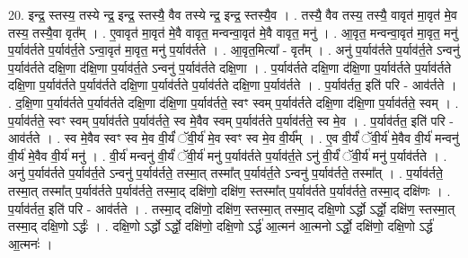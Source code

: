 \documentclass[17pt]{extarticle}
\begin{document}
20. इन्द्र॒ स्तस्य॒ तस्ये न्द्र॒ इन्द्र॒ स्तस्यै॒ वैव तस्ये न्द्र॒ इन्द्र॒ स्तस्यै॒व । . तस्यै॒ वैव तस्य॒ तस्यै॒ वावृत॑ मा॒वृत॑ मे॒व तस्य॒ तस्यै॒वा वृत᳚म् । . ए॒वावृत॑ मा॒वृत॑ मे॒वै वावृत॒ मन्वन्वा॒वृत॑ मे॒वै वावृत॒ मनु॑ । . आ॒वृत॒ मन्वन्वा॒वृत॑ मा॒वृत॒ मनु॑ प॒र्याव॑र्तते प॒र्याव॑र्त॒ते ऽन्वा॒वृत॑ मा॒वृत॒ मनु॑ प॒र्याव॑र्तते । . आ॒वृत॒मित्या᳚ - वृत᳚म् । . अनु॑ प॒र्याव॑र्तते प॒र्याव॑र्त॒ते ऽन्वनु॑ प॒र्याव॑र्तते दक्षि॒णा द॑क्षि॒णा प॒र्याव॑र्त॒ते ऽन्वनु॑ प॒र्याव॑र्तते दक्षि॒णा । . प॒र्याव॑र्तते दक्षि॒णा द॑क्षि॒णा प॒र्याव॑र्तते प॒र्याव॑र्तते दक्षि॒णा प॒र्याव॑र्तते प॒र्याव॑र्तते दक्षि॒णा प॒र्याव॑र्तते प॒र्याव॑र्तते दक्षि॒णा प॒र्याव॑र्तते । . प॒र्याव॑र्तत॒ इति॑ परि - आव॑र्तते । . द॒क्षि॒णा प॒र्याव॑र्तते प॒र्याव॑र्तते दक्षि॒णा द॑क्षि॒णा प॒र्याव॑र्तते॒ स्वꣳ स्वम् प॒र्याव॑र्तते दक्षि॒णा द॑क्षि॒णा प॒र्याव॑र्तते॒ स्वम् । . प॒र्याव॑र्तते॒ स्वꣳ स्वम् प॒र्याव॑र्तते प॒र्याव॑र्तते॒ स्व मे॒वैव स्वम् प॒र्याव॑र्तते प॒र्याव॑र्तते॒ स्व मे॒व । . प॒र्याव॑र्तत॒ इति॑ परि - आव॑र्तते । . स्व मे॒वैव स्वꣳ स्व मे॒व वी॒र्यं॑ ॅवी॒र्य॑ मे॒व स्वꣳ स्व मे॒व वी॒र्य᳚म् । . ए॒व वी॒र्यं॑ ॅवी॒र्य॑ मे॒वैव वी॒र्य॑ मन्वनु॑ वी॒र्य॑ मे॒वैव वी॒र्य॑ मनु॑ । . वी॒र्य॑ मन्वनु॑ वी॒र्यं॑ ॅवी॒र्य॑ मनु॑ प॒र्याव॑र्तते प॒र्याव॑र्त॒ते ऽनु॑ वी॒र्यं॑ ॅवी॒र्य॑ मनु॑ प॒र्याव॑र्तते । . अनु॑ प॒र्याव॑र्तते प॒र्याव॑र्त॒ते ऽन्वनु॑ प॒र्याव॑र्तते॒ तस्मा॒त् तस्मा᳚त् प॒र्याव॑र्त॒ते ऽन्वनु॑ प॒र्याव॑र्तते॒ तस्मा᳚त् । . प॒र्याव॑र्तते॒ तस्मा॒त् तस्मा᳚त् प॒र्याव॑र्तते प॒र्याव॑र्तते॒ तस्मा॒द् दक्षि॑णो॒ दक्षि॑ण॒ स्तस्मा᳚त् प॒र्याव॑र्तते प॒र्याव॑र्तते॒ तस्मा॒द् दक्षि॑णः । . प॒र्याव॑र्तत॒ इति॑ परि - आव॑र्तते । . तस्मा॒द् दक्षि॑णो॒ दक्षि॑ण॒ स्तस्मा॒त् तस्मा॒द् दक्षि॒णो ऽर्द्धो ऽर्द्धो॒ दक्षि॑ण॒ स्तस्मा॒त् तस्मा॒द् दक्षि॒णो ऽर्द्धः॑ । . दक्षि॒णो ऽर्द्धो ऽर्द्धो॒ दक्षि॑णो॒ दक्षि॒णो ऽर्द्ध॑ आ॒त्मन॑ आ॒त्मनो ऽर्द्धो॒ दक्षि॑णो॒ दक्षि॒णो ऽर्द्ध॑ आ॒त्मनः॑ । \newline
\end{document}
